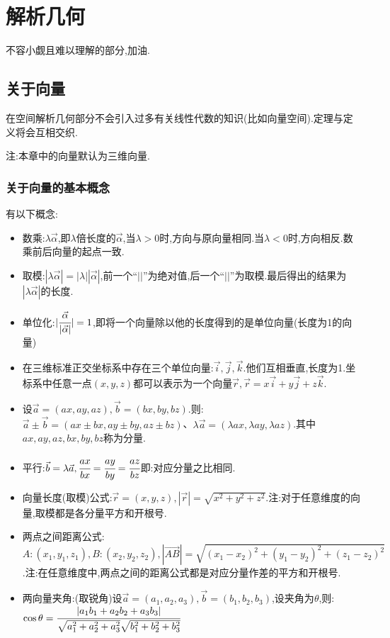 \section{解析几何}{
  不容小觑且难以理解的部分,加油.

  \subsection{关于向量}{
    在空间解析几何部分不会引入过多有关线性代数的知识(比如向量空间).定理与定义将会互相交织.

    注:本章中的向量默认为三维向量.

    \subsubsection{关于向量的基本概念}{
      有以下概念:
      \begin{itemize}
        \item 数乘:$\lambda \vec{\alpha}$,即$\lambda$倍长度的$\vec{\alpha}$,当$\lambda > 0$时,方向与原向量相同.当$\lambda < 0$时,方向相反.数乘前后向量的起点一致.
        \item 取模:$|\lambda\vec{\alpha}| = |\lambda||\vec{\alpha}|$,前一个“$||$”为绝对值,后一个“$||$”为取模.最后得出的结果为$|\lambda\vec{\alpha}|$的长度.
        \item 单位化:$|\cfrac{\vec{\alpha}}{|\vec{\alpha}|}| = 1$,即将一个向量除以他的长度得到的是单位向量(长度为1的向量)
        \item 在三维标准正交坐标系中存在三个单位向量:$\vec{i},\vec{j},\vec{k}$.他们互相垂直,长度为1.坐标系中任意一点$(x,y,z)$都可以表示为一个向量$\vec{r},\vec{r} = x\vec{i} + y\vec{j} + z\vec{k}$.
        \item 设$\vec{a} = (ax,ay,az),\vec{b} = (bx,by,bz)$.则:$\vec{a} \pm \vec{b} = (ax \pm bx,ay \pm by,az \pm bz)$、$\lambda\vec{a} = (\lambda ax,\lambda ay,\lambda az)$.其中$ax,ay,az,bx,by,bz$称为分量.
        \item 平行:$\vec{b} = \lambda\vec{a},\cfrac{ax}{bx} = \cfrac{ay}{by} = \cfrac{az}{bz}$即:对应分量之比相同.
        \item 向量长度(取模)公式:$\vec{r} = (x,y,z),|\vec{r}| = \sqrt{x^2 + y^2 + z^2}$.注:对于任意维度的向量,取模都是各分量平方和开根号.
        \item 两点之间距离公式:$A:(x_1,y_1,z_1),B:(x_2,y_2,z_2),|\vec{AB}| = \sqrt{(x_1 - x_2)^2 + (y_1 -y_2)^2 + (z_1 - z_2)^2}$.注:在任意维度中,两点之间的距离公式都是对应分量作差的平方和开根号.
        \item {
              两向量夹角:(取锐角)设$\vec{a} = (a_1, a_2, a_3),\vec{b} = (b_1,b_2,b_3)$,设夹角为$\theta$,则:$\cos\theta = \cfrac{|a_1b_1 + a_2b_2 + a_3b_3|}{\sqrt{a_1^2 + a_2^2 + a_3^2}\sqrt{b_1^2 + b_2^2 + b_3^2}}$

}
\end{itemize}}}}
